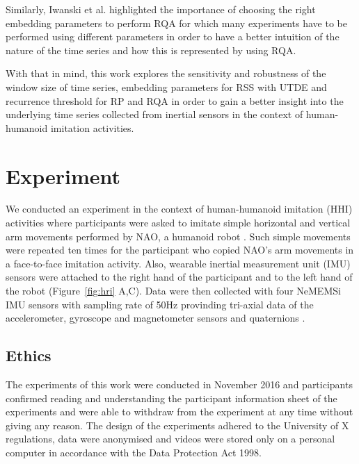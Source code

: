 \documentclass[fleqn,10pt]{wlscirep}
\begin{document}
Similarly, Iwanski et al. \cite{iwanski1998} highlighted the importance 
of choosing the right embedding parameters to perform RQA for which 
many experiments have to be performed using different parameters in order 
to have a better intuition of the nature of the time series and how 
this is represented by using RQA.

With that in mind, this work explores the sensitivity and robustness 
of the window size of time series, embedding parameters for RSS with UTDE 
and recurrence threshold for RP and RQA in order to gain a better insight 
into the underlying time series collected from inertial sensors in the 
context of human-humanoid imitation activities.







\section*{Experiment} \label{sec:experiment}
We conducted an experiment in the context of human-humanoid imitation (HHI) 
activities where participants were asked to imitate simple horizontal and 
vertical arm movements performed by NAO, a humanoid robot \cite{gouaillier2009}.
Such simple movements were repeated ten times for the participant 
who copied NAO's arm movements in a face-to-face imitation activity.
Also, wearable inertial measurement unit (IMU) sensors were attached 
to the right hand of the participant and to the left hand of the robot 
(Figure~\ref{fig:hri} A,C). Data were then collected with four NeMEMSi 
IMU sensors with sampling rate of 50Hz provinding tri-axial data of the 
accelerometer, gyroscope and magnetometer sensors and quaternions 
\cite{Comotti2014}. 

\subsection*{Ethics}
The experiments of this work were conducted in November 2016 and participants
confirmed reading and understanding the participant information sheet of the 
experiments and were able to withdraw from the experiment at any time without giving
any reason. The design of the experiments adhered to the University of X
regulations, data were anonymised and videos were stored only on a 
personal computer in accordance with the Data Protection Act 1998. 
\end{document}

